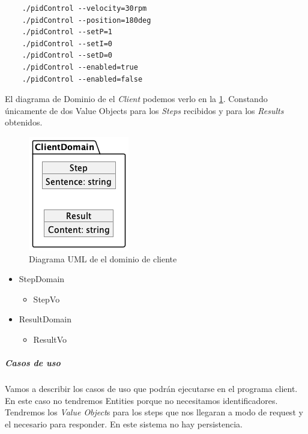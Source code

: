 \begin{verbatim}
    ./pidControl --velocity=30rpm
    ./pidControl --position=180deg
    ./pidControl --setP=1
    ./pidControl --setI=0
    ./pidControl --setD=0
    ./pidControl --enabled=true
    ./pidControl --enabled=false
\end{verbatim}

El diagrama de Dominio de el \textit{Client} podemos verlo en la \cref{fig:Diagrama UML de el dominio de cliente}. Constando únicamente de dos Value Objects para los \textit{Steps} recibidos y para los \textit{Results} obtenidos.

\begin{figure}[H]
    \centering
    \includegraphics[height=0.2\textheight]{./part/Proyecto_ejecutivo/memoria_descriptiva/descripcionDelProyecto/client/uml/clientDomain}
    \caption{Diagrama UML de el dominio de cliente}\label{fig:Diagrama UML de el dominio de cliente}
\end{figure}

\begin{itemize}
    \item StepDomain
    \begin{itemize}
        \item StepVo
    \end{itemize}
    \item ResultDomain
    \begin{itemize}
        \item ResultVo
    \end{itemize}
\end{itemize}

\subparagraph{Casos de uso}

Vamos a describir los casos de uso que podrán ejecutarse en el programa client. En este caso no tendremos Entities porque no necesitamos identificadores.
Tendremos los \textit{Value Object}s para los steps que nos llegaran a modo de request y el necesario para responder. En este sistema no hay persistencia.

